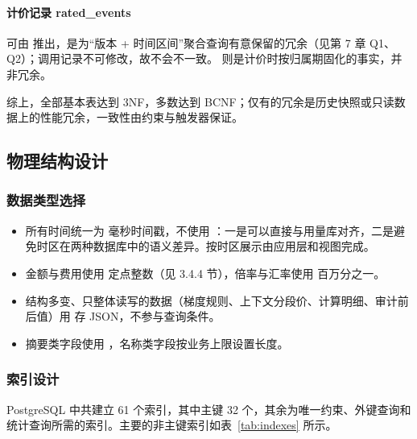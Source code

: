 \paragraph{计价记录 rated\_events}
 可由  推出，是为“版本 + 时间区间”聚合查询有意保留的冗余（见第 7 章 Q1、Q2）；调用记录不可修改，故不会不一致。 则是计价时按归属期固化的事实，并非冗余。

综上，全部基本表达到 3NF，多数达到 BCNF；仅有的冗余是历史快照或只读数据上的性能冗余，一致性由约束与触发器保证。

\subsection{物理结构设计}

\subsubsection{数据类型选择}

\begin{itemize}
  \item 所有时间统一为  毫秒时间戳，不使用 ：一是可以直接与用量库对齐，二是避免时区在两种数据库中的语义差异。按时区展示由应用层和视图完成。
  \item 金额与费用使用  定点整数（见 3.4.4 节），倍率与汇率使用  百万分之一。
  \item 结构多变、只整体读写的数据（梯度规则、上下文分段价、计算明细、审计前后值）用  存 JSON，不参与查询条件。
  \item 摘要类字段使用 ，名称类字段按业务上限设置长度。
\end{itemize}

\subsubsection{索引设计}

PostgreSQL 中共建立 61 个索引，其中主键 32 个，其余为唯一约束、外键查询和统计查询所需的索引。主要的非主键索引如表~\ref{tab:indexes} 所示。

